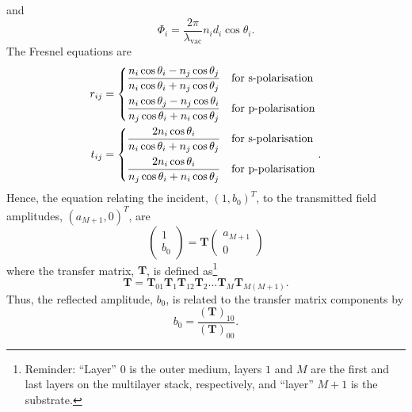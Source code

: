 \documentclass[]{article}
\begin{document}
	and 
	\begin{equation}
		\Phi_i=\frac{2\pi}{\lambda_\text{vac}}n_id_i\cos\theta_i.
	\end{equation}
	The Fresnel equations are 
	\begin{align}
		r_{ij}&=
		\begin{dcases}
			\frac{n_i \cos\theta_i - n_j \cos\theta_j}{n_i \cos\theta_i + n_j \cos\theta_j}&\text{for s-polarisation}\\
			\frac{n_i \cos\theta_j-n_j \cos\theta_i}{n_j \cos\theta_i + n_i \cos\theta_j}&\text{for p-polarisation}
		\end{dcases}\\
		t_{ij}&=
		\begin{dcases}
			\frac{2 n_i \cos\theta_i}{n_i \cos\theta_i + n_j \cos\theta_j}&\text{for s-polarisation}\\
			\frac{2 n_i \cos\theta_i}{n_j \cos\theta_i + n_i \cos\theta_j}&\text{for p-polarisation}
		\end{dcases}.
	\end{align}
	Hence, the equation relating the incident, $(1, b_0)^T$, to the transmitted field amplitudes, $(a_{M+1},0)^T$, are
	\begin{equation}
		\begin{pmatrix}
			1\\b_0
		\end{pmatrix}=
		\mathbf{T}
		\begin{pmatrix}
			a_{M+1}\\0
		\end{pmatrix}
	\end{equation}
	where the transfer matrix, $\mathbf{T}$, is defined as\footnote{Reminder: ``Layer'' $0$ is the outer medium, layers $1$ and $M$ are the first and last layers on the multilayer stack, respectively, and ``layer'' $M+1$ is the substrate.}
	\begin{equation}
		\mathbf{T}=\mathbf{T}_{01}\mathbf{T}_1\mathbf{T}_{12}\mathbf{T}_2\dots\mathbf{T}_{M}\mathbf{T}_{M(M+1)}.
	\end{equation}
	Thus, the reflected amplitude, $b_0$, is related to the transfer matrix components by
	\begin{equation}
		b_0=\frac{(\mathbf{T})_{10}}{(\mathbf{T})_{00}}.
	\end{equation}

	
%	
%	
	
\end{document}
